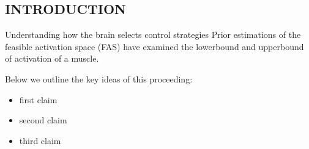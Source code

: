 \begin{introduction}
\section{INTRODUCTION}

Understanding how the brain selects control strategies  Prior estimations of the feasible activation space (FAS) have examined the lowerbound and upperbound of activation of a muscle.


Below we outline the key ideas of this proceeding:
\begin{itemize}

\item first claim
\item second claim
\item third claim

\end{itemize}

\end{introduction}